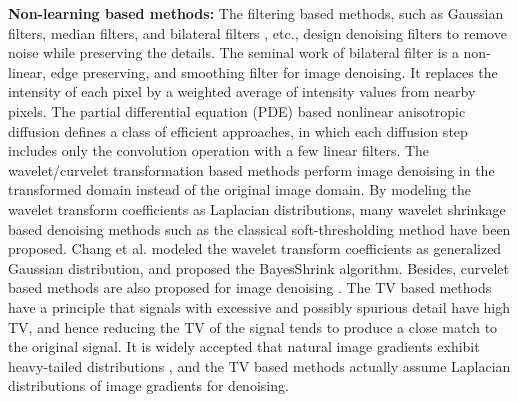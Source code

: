 
\textbf{Non-learning based methods:} The filtering based methods, such as Gaussian filters, median filters, and bilateral filters \cite{Tomasi1998}, etc., design denoising filters to remove noise while preserving the details. The seminal work of bilateral filter \cite{Tomasi1998} is a non-linear, edge preserving, and smoothing filter for image denoising. It replaces the intensity of each pixel by a weighted average of intensity values from nearby pixels. The partial differential equation (PDE) based nonlinear anisotropic diffusion \cite{PeronaMalik1990} defines a class of efficient approaches, in which each diffusion step includes only the convolution operation with a few linear filters. The wavelet/curvelet transformation based methods perform image denoising in the transformed domain instead of the original image domain. By modeling the wavelet transform coefficients as Laplacian distributions, many wavelet shrinkage based denoising methods such as the classical soft-thresholding method \cite{softthresholding} have been proposed. Chang et al. modeled the wavelet transform coefficients as generalized Gaussian distribution, and proposed the BayesShrink \cite{bayesshrink} algorithm. Besides, curvelet based methods are also proposed for image denoising \cite{curvelet}. The TV based methods \cite{rudin1992nonlinear,osher2005iterative} have a principle that signals with excessive and possibly spurious detail have high TV, and hence reducing the TV of the signal tends to produce a close match to the original signal. It is widely accepted that natural image gradients exhibit heavy-tailed distributions \cite{weiss}, and the TV based methods \cite{rudin1992nonlinear,osher2005iterative} actually assume Laplacian distributions of image gradients for denoising. 

